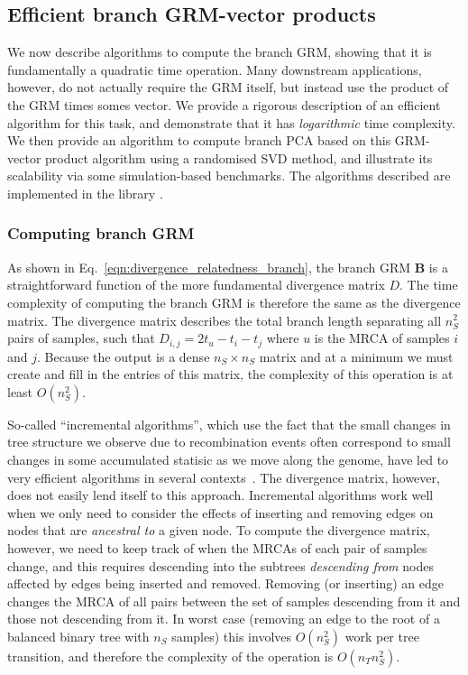 \subsection{Efficient branch GRM-vector products}
We now describe algorithms to compute the branch GRM, showing that it is 
fundamentally a quadratic time operation. Many downstream applications, however,
do not actually require the GRM itself, but instead use the product of the 
GRM times somes vector. We provide a rigorous description of an efficient 
algorithm for this task, and demonstrate that it has \emph{logarithmic} time complexity.
We then provide an algorithm to compute branch PCA based on this GRM-vector
product algorithm using a randomised SVD method, and illustrate its scalability
via some simulation-based benchmarks.
The algorithms described are implemented in 
the \tskit{} library \citep{ralph2020efficiently, kelleher2024tskit}.

\subsubsection{Computing branch GRM}
As shown in Eq.~\eqref{eqn:divergence_relatedness_branch}, the branch GRM
$\mathbf{B}$ is a 
straightforward function of the more fundamental divergence matrix $D$.
The time complexity of computing the branch GRM is therefore the same as 
the divergence matrix.
The divergence matrix describes
the total branch length separating all $n_S^2$ pairs of samples, such 
that $D_{i,j} = 2t_u - t_i - t_j$ where $u$ is the MRCA of samples $i$ and $j$.
Because the output is a dense $n_S \times n_S$ matrix 
and at a minimum we must create and fill in the entries of this matrix,
the complexity of this operation is at least $O(n_S^2)$.

So-called ``incremental algorithms'', which use the fact that the 
small changes in tree structure we observe due to recombination events
often correspond to small changes in some accumulated statisic as 
we move along the genome,
have led to very efficient algorithms in several 
contexts~\citep{kelleher2016efficient,ralph2020efficiently,kelleher2020coalescent}. 
The divergence matrix, however, does not easily lend itself to this approach.
Incremental algorithms work well when we only need to consider the effects 
of inserting and removing edges on nodes that are \emph{ancestral to}
a given node. To compute the divergence matrix, however, we need to keep track
of when the MRCAs of each pair of samples change, and this requires 
descending into the subtrees \emph{descending from} nodes affected by 
edges being inserted and removed. Removing (or inserting) an edge changes the MRCA of 
all pairs between the set of samples descending from it 
and those not descending from it. In worst case (removing an edge to the 
root of a balanced binary tree with $n_S$ samples) this involves 
$O(n_S^2)$ work per tree transition, and therefore the complexity of the 
operation is $O(n_T n_S^2)$. 

